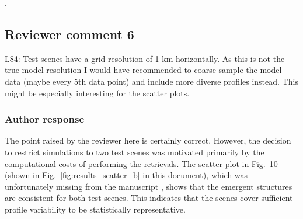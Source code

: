\begin{change}[51]
\DIFaddend .
\end{change}


%
%
%


\subsection*{Reviewer comment 6}

L84: Test scenes have a grid resolution of 1 km horizontally. As this is not the
true model resolution I would have recommended to coarse sample the model data
(maybe every 5th data point) and include more diverse profiles instead. This
might be especially interesting for the scatter plots.

\subsubsection*{Author response}

The point raised by the reviewer here is certainly correct. However, the
decision to restrict simulations to two test scenes was motivated primarily by
the computational costs of performing the retrievals. The scatter plot in
Fig.~10 (shown in Fig.~\ref{fig:results_scatter_b} in this document), which was
unfortunately missing from the manuscript , shows that the emergent structures
are consistent for both test scenes. This indicates that the scenes cover
sufficient profile variability to be statistically representative.


